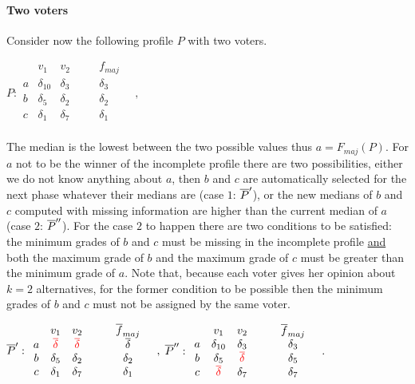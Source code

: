\documentclass[version=3.21, pagesize, twoside=off, bibliography=totoc, DIV=calc, fontsize=12pt, a4paper]{scrartcl}
\begin{document}
\paragraph{Two voters}
Consider now the following profile $P$ with two voters.
\begin{center}
	$P:
	\begin{array}{ccccc}
		& v_1 & v_2 & \quad & f_{maj} \\
		a &	\delta_{10} & \delta_3 & \quad& \delta_3 \\
		b &	\delta_5 & \delta_2 &\quad& \delta_2 \\
		c &	\delta_1 & \delta_7 &\quad& \delta_1 \\
	\end{array} \quad, \qquad
	$
\end{center}
The median is the lowest between the two possible values thus $a=F_{maj}(P)$. For $a$ not to be the winner of the incomplete profile there are two possibilities, either we do not know anything about $a$, then $b$ and $c$ are automatically selected for the next phase whatever their medians are (case $1$: $\overline{P}'$), or the new medians of $b$ and $c$ computed with missing information are higher than the current median of $a$ (case $2$: $\overline{P}^{\prime\prime}$). For the case $2$ to happen there are two conditions to be satisfied: the minimum grades of $b$ and $c$ must be missing in the incomplete profile \underline{and} both the maximum grade of $b$ and the maximum grade of $c$ must be greater than the minimum grade of $a$. Note that, because each voter gives her opinion about $k=2$ alternatives, for the former condition to be possible then the minimum grades of $b$ and $c$ must not be assigned by the same voter. 

\begin{center}
	$\overline{P}':
	\begin{array}{ccccc}
		& v_1 & v_2 & \quad & \overline{f}_{maj} \\
		a &	{\color{red}\overline{\delta}} & {\color{red}\overline{\delta}} & \quad& \overline{\delta} \\
		b &	\delta_5 & \delta_2 &\quad& \delta_2 \\
		c &	\delta_1 & \delta_7 &\quad& \delta_1 \\
	\end{array} \quad,
	$
	$\overline{P}^{\prime\prime}:
	\begin{array}{ccccc}
		& v_1 & v_2 & \quad & \overline{f}_{maj} \\
		a &	\delta_{10} & \delta_3 & \quad& \delta_3 \\
		b &	\delta_5 & {\color{red}\overline{\delta}} &\quad& \delta_5 \\
		c &	{\color{red}\overline{\delta}} & \delta_7 &\quad& \delta_7 \\
	\end{array} \quad.
	$
\end{center}
\end{document}
